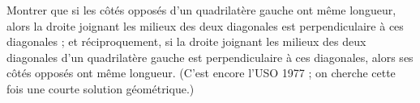 Montrer que si les côtés opposés d'un quadrilatère gauche ont même longueur, alors la droite joignant les milieux des deux diagonales est perpendiculaire à ces diagonales ; et réciproquement, si la droite joignant les milieux des deux diagonales d'un quadrilatère gauche est perpendiculaire à ces diagonales, alors ses côtés opposés ont même longueur. (C'est encore l'USO 1977 ; on cherche cette fois une courte solution géométrique.)
